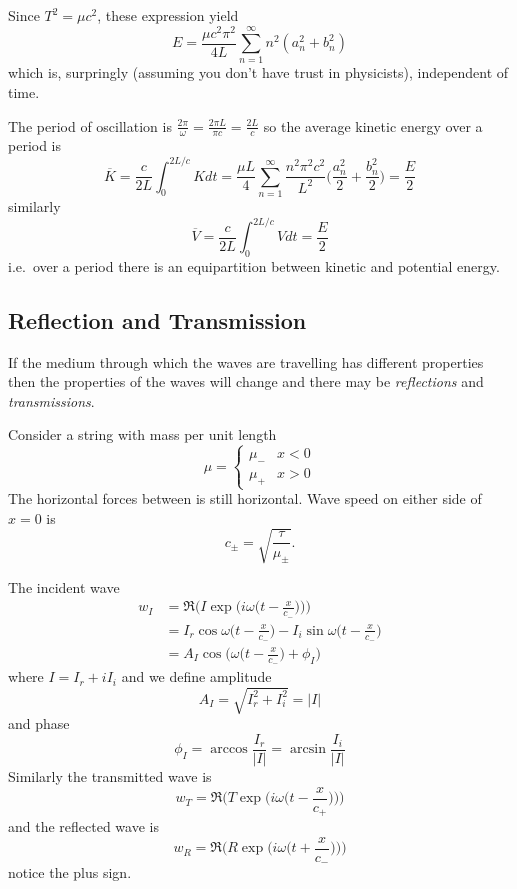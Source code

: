 \documentclass[a4paper]{article}
\begin{document}
Since \(T^2 = \mu c^2\), these expression yield
\[
  E = \frac{\mu c^2\pi^2}{4L} \sum_{n=1}^{\infty} n^2(a_n^2+b_n^2)
\]
which is, surpringly (assuming you don't have trust in physicists), independent of time.

The period of oscillation is \(\frac{2\pi}{\omega} = \frac{2\pi L}{\pi c} =\frac{2L}{c}\) so the average kinetic energy over a period is
\[
  \overline K = \frac{c}{2L} \int_{0}^{2L/c} K dt = \frac{\mu L}{4} \sum_{n=1}^{\infty} \frac{n^2\pi^2c^2}{L^2} \Big( \frac{a_n^2}{2} + \frac{b_n^2}{2} \Big) = \frac{E}{2}
\]
similarly
\[
  \overline V = \frac{c}{2L} \int_{0}^{2L/c} V dt = \frac{E}{2}
\]
i.e.\ over a period there is an equipartition between kinetic and potential energy.

\subsection{Reflection and Transmission}

If the medium through which the waves are travelling has different properties then the properties of the waves will change and there may be \emph{reflections} and \emph{transmissions}.

Consider a string with mass per unit length
\[
  \mu =
  \begin{cases}
    \mu_- & x< 0 \\
    \mu_+ & x>0
  \end{cases}
\]
The horizontal forces between is still horizontal. Wave speed on either side of \(x=0\) is
\[
  c_\pm = \sqrt{\frac{\tau}{\mu_\pm}}.
\]

The incident wave
\begin{align*}
  w_I &= \Re \Bigg(I \exp \Big( i\omega \Big(t- \frac{x}{c_-} \Big) \Big) \Bigg) \\
      &= I_r \cos \omega \Big(t - \frac{x}{c_-} \Big) - I_i \sin\omega \Big(t- \frac{x}{c_-} \Big) \\
      &= A_I \cos \Big(\omega \Big(t-\frac{x}{c_-} \Big) + \phi_I\Big)
\end{align*}
where \(I = I_r + i I_i\) and we define amplitude
\[
  A_I = \sqrt{I_r^2+I_i^2} = |I| 
\]
and phase
\[
  \phi_I = \arccos \frac{I_r}{|I|} = \arcsin \frac{I_i}{|I|}
\]
Similarly the transmitted wave is
\[
  w_T = \Re \Bigg(T \exp \Big(i\omega \Big(t- \frac{x}{c_+} \Big)\Big)\Bigg)
\]
and the reflected wave is
\[
  w_R = \Re \Bigg(R\exp\Big(i\omega\Big(t+ \frac{x}{c_-}\Big)\Big)\Bigg)
\]
notice the plus sign.
\end{document}
